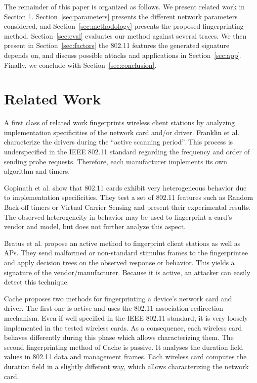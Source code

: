 \documentclass[10pt, conference, compsocconf, letterpaper]{IEEEtran}
\begin{document}
The remainder of this paper is organized as follows. We present related work 
in Section \ref{sec:related}. Section~\ref{sec:parameters} presents the different network parameters considered, and Section~\ref{sec:methodology} presents the proposed fingerprinting method.
Section~\ref{sec:eval} evaluates our method against several traces. 
We then present in Section~\ref{sec:factors} the  
802.11 features the generated signature depends on, and discuss possible 
attacks and applications in Section~\ref{sec:app}. Finally, we conclude
with Section~\ref{sec:conclusion}.


\section{Related Work}
\label{sec:related}

A first class of related work fingerprints wireless client stations by analyzing
implementation specificities of the network card and/or driver. Franklin et al. \cite{Franklin:Security06} 
characterize the drivers during the ``active scanning period''. 
This process is underspecified in the IEEE 802.11 standard regarding the frequency and order 
of sending probe requests. Therefore, each manufacturer implements its own algorithm and timers. 


Gopinath et al. \cite{Gopinath:WiNTECH} show that 802.11 cards exhibit very 
heterogeneous behavior due to implementation specificities. They test a set of 802.11 features such
as Random Back-off timers or Virtual Carrier Sensing and present their experimental results.
The observed heterogeneity in behavior may be used 
to fingerprint a card's vendor and model, but does not further analyze this aspect.

Bratus et al. \cite{Bratus:WISEC} propose an active method to fingerprint client stations as well as APs.
They send malformed or non-standard stimulus frames to the fingerprintee and apply decision trees on the observed response or behavior.
This yields a signature of the vendor/manufacturer.
Because it is active, an attacker can easily detect this technique.

Cache \cite{Cache:MasterThesis} proposes two methods for fingerprinting a device's network card and driver. 
The first one is active and uses the 802.11 association redirection mechanism. Even if well specified in 
the IEEE 802.11 standard, it is very loosely implemented in the tested wireless cards. As a consequence,  
each wireless card behaves differently during this phase which allows characterizing them. 
The second fingerprinting method of Cache is passive. It analyses the duration field values in 
802.11 data and management frames. Each wireless 
card computes the duration field in a slightly different way, which allows characterizing
the network card. 
\end{document}
